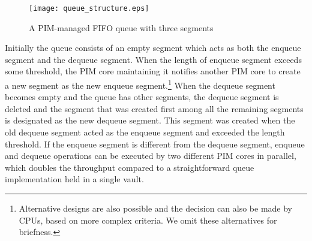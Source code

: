 \begin{figure}[ht!]
\centering
\texttt{[image: queue\_structure.eps]}
\caption{A PIM-managed FIFO queue with three segments}
\label{figure:queue_structure}
\end{figure}

Initially the queue consists of an empty segment which acts as both the enqueue segment and 
the dequeue segment. 
When the length of enqueue segment exceeds some threshold, the PIM core maintaining it
notifies another PIM core to create a new segment as the new enqueue segment.\footnote{
Alternative designs are also possible and the decision can also be made by CPUs,
based on more complex criteria. We omit these alternatives for briefness.}
When the dequeue segment becomes empty and the queue has other segments, 
the dequeue segment is deleted and the segment that was created first 
among all the remaining segments is designated as the new dequeue segment. 
This segment was created when the old dequeue segment 
acted as the enqueue segment and exceeded the length threshold.
If the enqueue segment is different from the dequeue segment, 
enqueue and dequeue operations can be executed by two different PIM cores 
in parallel, which doubles the throughput compared to a straightforward queue implementation 
held in a single vault.  


